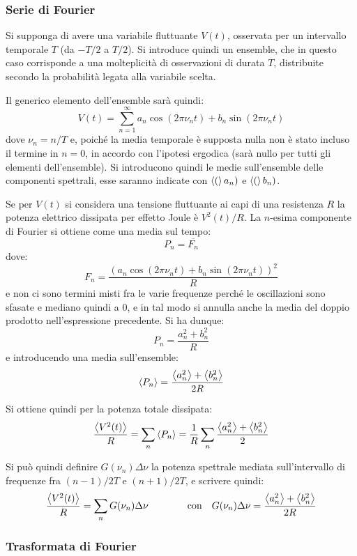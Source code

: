\subsubsection{Serie di Fourier}

Si supponga di avere una variabile fluttuante $ V(t) $, osservata per un intervallo temporale $ T $ (da $ -T/2 $ a $ T/2 $). Si introduce quindi un ensemble, che in questo caso corrisponde a una molteplicità di osservazioni di durata $ T $, distribuite secondo la probabilità legata alla variabile scelta.

Il generico elemento dell'ensemble sarà quindi:
\[ V(t) = \sum_{n=1}^{\infty} a_n \cos(2\pi \nu_n t) + b_n \sin(2\pi\nu_n t)\]
dove $ \nu_n = n/T $ e, poiché la media temporale è supposta nulla non è stato incluso il termine in $ n = 0 $, in accordo con l'ipotesi ergodica (sarà nullo per tutti gli elementi dell'ensemble). Si introducono quindi le medie sull'ensemble delle componenti spettrali, esse saranno indicate con $ \expval(a_n) $ e $ \expval(b_n) $.

Se per $ V(t) $ si considera una tensione fluttuante ai capi di una resistenza $ R $ la potenza elettrico dissipata per effetto Joule è $ V^2(t)/R $. La $ n $-esima componente di Fourier si ottiene come una media sul tempo:
\[ P_n = \overline{F_n} \]
dove:
\[ F_n = \frac{(a_n \cos(2\pi \nu_n t) + b_n \sin(2\pi\nu_n t))^2}{R} \]
e non ci sono termini misti fra le varie frequenze perché le oscillazioni sono sfasate e mediano quindi a $ 0 $, e in tal modo si annulla anche la media del doppio prodotto nell'espressione precedente. Si ha dunque:
\[ P_n = \frac{a_n^2 + b_n^2}{R} \]
e introducendo una media sull'ensemble:
\[ \expval{P_n} = \frac{\expval{a_n^2 }+ \expval{b_n^2}}{2R} \]

Si ottiene quindi per la potenza totale dissipata:
\[ \frac{\expval{V^2(t)}}{R} = \sum_n \expval{P_n} =\frac{1}{R} \sum_n \frac{\expval{a_n^2 }+ \expval{b_n^2}}{2}\]

Si può quindi definire $ G(\nu_n) \Delta \nu $ la potenza spettrale mediata sull'intervallo di frequenze fra $ (n-1)/2T $ e $ (n+1)/2T $, e scrivere quindi:
\[ \frac{\expval{V^2(t)}}{R} = \sum_n G(\nu_n) \Delta \nu \qquad \qquad \text{con} \quad G(\nu_n) \Delta \nu = \frac{\expval{a_n^2 }+ \expval{b_n^2}}{2R} \]

\subsubsection{Trasformata di Fourier}


